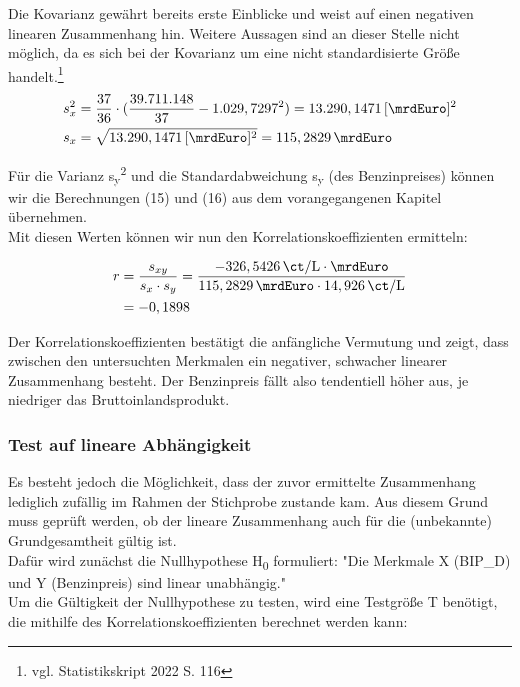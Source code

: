 Die Kovarianz gewährt bereits erste Einblicke und weist auf einen negativen linearen Zusammenhang hin. Weitere Aussagen sind an dieser Stelle nicht möglich, da es sich bei der Kovarianz um eine nicht standardisierte Größe handelt.\footnote{vgl. Statistikskript 2022 S. 116}\\

\begin{align}
  s_x^2 &= \frac{37}{36} \cdot (\frac{39.711.148}{37} - 1.029,7297^2) = 13.290,1471 \, [\si{\mrdEuro}]^2\\
  s_x &= \sqrt{13.290,1471 \, [\si{\mrdEuro}]^2} = 115,2829 \,\si{\mrdEuro}
\end{align}

Für die Varianz s\textsubscript{y}\textsuperscript{2} und die Standardabweichung s\textsubscript{y} (des Benzinpreises) können wir die Berechnungen (15) und (16) aus dem vorangegangenen Kapitel übernehmen.\\
Mit diesen Werten können wir nun den Korrelationskoeffizienten ermitteln:

\begin{align}
  r &= \frac{s_{xy}}{s_x \cdot s_y} = \frac{-326,5426 \, \si{\ct\per\liter} \cdot \si{\mrdEuro}}{115,2829 \,\si{\mrdEuro} \cdot 14,926 \, \si{\ct\per\liter}}\\
    &= -0,1898
\end{align}

Der Korrelationskoeffizienten bestätigt die anfängliche Vermutung und zeigt, dass zwischen den untersuchten Merkmalen ein negativer, schwacher linearer Zusammenhang besteht.
Der Benzinpreis fällt also tendentiell höher aus, je niedriger das Bruttoinlandsprodukt.\\

\subsubsection{Test auf lineare Abhängigkeit}
Es besteht jedoch die Möglichkeit, dass der zuvor ermittelte Zusammenhang lediglich zufällig im Rahmen der Stichprobe zustande kam. Aus diesem Grund muss geprüft werden, ob der lineare Zusammenhang auch für die (unbekannte) Grundgesamtheit gültig ist. \\
Dafür wird zunächst die Nullhypothese H\textsubscript{0} formuliert: "Die Merkmale X (BIP\_D) und Y (Benzinpreis) sind linear unabhängig."\\

Um die Gültigkeit der Nullhypothese zu testen, wird eine Testgröße T benötigt, die mithilfe des Korrelationskoeffizienten  berechnet werden kann:


